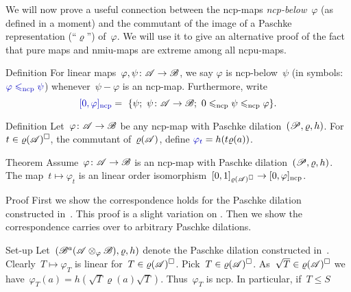 \begin{parsec}%
\begin{point}%
We will now prove a useful connection between
    the ncp-maps \emph{ncp-below}~$\varphi$ (as defined in a moment)
    and the commutant of the image
    of a Paschke representation (``$\varrho$'') of~$\varphi$.
We will use it to give an alternative proof
    of the fact that pure maps and nmiu-maps
    are extreme among all ncpu-maps.
\end{point}
\begin{point}{Definition}%
For linear  maps~$\varphi, \psi\colon \mathscr{A} \to \mathscr{B}$,
    we say $\varphi$ is ncp-below~$\psi$
    (in symbols:~$\Define{\varphi \mathrel{\leq_\ncp} \psi}$\index{$\leq_\ncp$})
    whenever~$\psi - \varphi$ is an ncp-map.
    Furthermore, write
    \begin{equation*}
        \Define{[0,\varphi]_\ncp}\index{$[0,\varphi]_\ncp$} =\  
        \{\psi; \ \psi \colon \scrA \to \scrB;
            \ 0 \leq_\ncp\psi \leq_\ncp \varphi \}.
    \end{equation*}
\end{point}
\begin{point}{Definition}%
    Let~$\varphi\colon \mathscr{A} \to \mathscr{B}$ be any ncp-map with Paschke
        dilation~$(\mathscr{P}, \varrho, h)$.
        For~$t \in \varrho(\mathscr{A})^\square$, the commutant of~$\varrho(\mathscr{A})$,
        define $\Define{\varphi_t}\index{$\varphi_t$} = h(t \varrho(a))$.
\end{point}
\begin{point}[paschke-correspondence]{Theorem}%
Assume~$\varphi\colon \mathscr{A} \to \mathscr{B}$ is an ncp-map
    with Paschke dilation~$(\mathscr{P}, \varrho, h)$.
The map~$t \mapsto \varphi_t$ is an linear
order isomorphism~$[0,1]_{\varrho(\mathscr{A})^\square} \to [0,\varphi]_{\mathrm{ncp}}$.
\begin{point}{Proof}
First we show the correspondence holds
    for the Paschke dilation constructed in~.
This proof is a slight variation on \cite[Prop.~5.4]{paschke}.
Then we show the correspondence carries over to arbitrary Paschke dilations.
\begin{point}{Set-up}%
Let~$(\mathscr{B}^a(\mathscr{A} \otimes_\varphi \mathscr{B}), \varrho, h)$
    denote the Paschke dilation constructed in~.
Clearly~$T \mapsto \varphi_T$ is linear
    for~$T \in \varrho(\mathscr{A})^\square$.
Pick~$T \in \varrho(\mathscr{A})^\square$.
As~$\sqrt{T} \in \varrho(\mathscr{A})^\square$
    we have~$\varphi_T(a) = h(\sqrt{T} \varrho(a)\sqrt{T})$.
    Thus~$\varphi_T$ is ncp.
In particular, if~$T \leq S$

\end{point}
\end{point}
\end{point}
\end{parsec}
